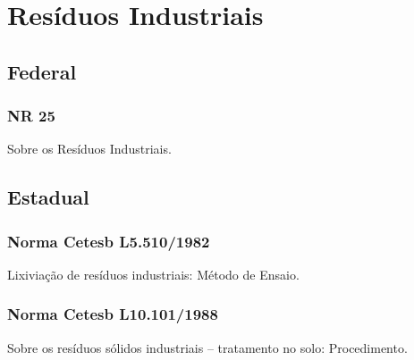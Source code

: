 \section{Resíduos Industriais}
\begin{subapend}
	\subsection{Federal}
	\begin{subsubapend}
		\item \subsubsection{NR 25}
		Sobre os Resíduos Industriais.
	\end{subsubapend}
\end{subapend}

\begin{subapend}
	\subsection{Estadual}
	\begin{subsubapend}
		\item \subsubsection{Norma Cetesb L5.510/1982}
		Lixiviação de resíduos industriais: Método de Ensaio.
		\subsubsection{Norma Cetesb L10.101/1988}
		Sobre os resíduos sólidos industriais – tratamento no solo: Procedimento.
	\end{subsubapend}
\end{subapend}

